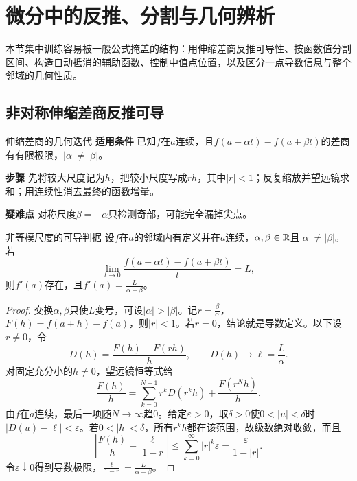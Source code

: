 \section{微分中的反推、分割与几何辨析}\label{cd:differential}
\begin{examtip}
本节集中训练容易被一般公式掩盖的结构：用伸缩差商反推可导性、按函数值分割区间、构造自动抵消的辅助函数、控制中值点位置，以及区分一点导数信息与整个邻域的几何性质。
\end{examtip}

\subsection{非对称伸缩差商反推可导}
\begin{method}{伸缩差商的几何迭代}
\textbf{适用条件} 已知$f$在$a$连续，且$f(a+\alpha t)-f(a+\beta t)$的差商有有限极限，$|\alpha|\ne|\beta|$。\par
\textbf{步骤} 先将较大尺度记为$h$，把较小尺度写成$rh$，其中$|r|<1$；反复缩放并望远镜求和；用连续性消去最终的函数增量。\par
\textbf{疑难点} 对称尺度$\beta=-\alpha$只检测奇部，可能完全漏掉尖点。
\end{method}
\begin{theorem}{非等模尺度的可导判据}\label{cd:dilation-test}
设$f$在$a$的邻域内有定义并在$a$连续，$\alpha,\beta\in\mathbb{R}$且$|\alpha|\ne|\beta|$。若
\[
 \lim_{t\to0}\dfrac{f(a+\alpha t)-f(a+\beta t)}{t}=L,
\]
则$f'(a)$存在，且$f'(a)=\frac{L}{\alpha-\beta}$。
\end{theorem}
\begin{proof}
交换$\alpha,\beta$只使$L$变号，可设$|\alpha|>|\beta|$。记$r=\frac{\beta}{\alpha}$，$F(h)=f(a+h)-f(a)$，则$|r|<1$。若$r=0$，结论就是导数定义。以下设$r\ne0$，令
\[
 D(h)=\dfrac{F(h)-F(rh)}{h},\qquad D(h)\to\ell=\dfrac L\alpha.
\]
对固定充分小的$h\ne0$，望远镜恒等式给
\[
 \dfrac{F(h)}h
 =\sum_{k=0}^{N-1}r^kD(r^kh)+\dfrac{F(r^Nh)}h.
\]
由$f$在$a$连续，最后一项随$N\to\infty$趋0。给定$\varepsilon>0$，取$\delta>0$使$0<|u|<\delta$时$|D(u)-\ell|<\varepsilon$。若$0<|h|<\delta$，所有$r^kh$都在该范围，故级数绝对收敛，而且
\[
 \left|\dfrac{F(h)}h-\dfrac{\ell}{1-r}\right|
 \le\sum_{k=0}^{\infty}|r|^k\varepsilon
 =\dfrac{\varepsilon}{1-|r|}.
\]
令$\varepsilon\downarrow0$得到导数极限，$\frac{\ell}{1-r}=\frac{L}{\alpha-\beta}$。
\end{proof}
